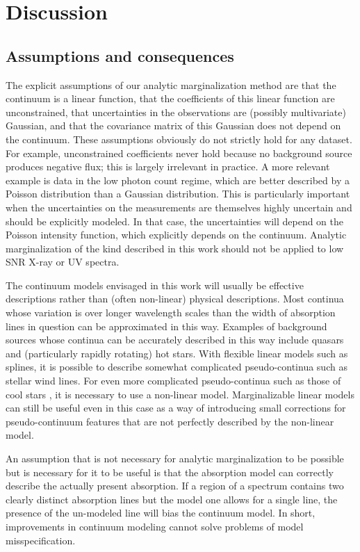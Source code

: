 \documentclass[manuscript]{aastex62}
\begin{document}
\section{Discussion}
\label{sec:discussion}
\subsection{Assumptions and consequences}
The explicit assumptions of our analytic marginalization method are that the continuum is a linear function, that the coefficients of this linear function are unconstrained, that uncertainties in the observations are (possibly multivariate) Gaussian, and that the covariance matrix of this Gaussian does not depend on the continuum.
These assumptions obviously do not strictly hold for any dataset.
For example, unconstrained coefficients never hold because no background source produces negative flux; this is largely irrelevant in practice.
A more relevant example is data in the low photon count regime, which are better described by a Poisson distribution than a Gaussian distribution.
This is particularly important when the uncertainties on the measurements are themselves highly uncertain and should be explicitly modeled.
In that case, the uncertainties will depend on the Poisson intensity function, which explicitly depends on the continuum.
Analytic marginalization of the kind described in this work should not be applied to low SNR X-ray or UV spectra.

The continuum models envisaged in this work will usually be effective descriptions rather than (often non-linear) physical descriptions.
Most continua whose variation is over longer wavelength scales than the width of absorption lines in question can be approximated in this way.
Examples of background sources whose continua can be accurately described in this way include quasars and (particularly rapidly rotating) hot stars.
With flexible linear models such as splines, it is possible to describe somewhat complicated pseudo-continua such as stellar wind lines.
For even more complicated pseudo-continua such as those of cool stars \citep[e.g.]{Zasowski:2015hi}, it is necessary to use a non-linear model.
Marginalizable linear models can still be useful even in this case as a way of introducing small corrections for pseudo-continuum features that are not perfectly described by the non-linear model.

An assumption that is not necessary for analytic marginalization to be possible but is necessary for it to be useful is that the absorption model can correctly describe the actually present absorption.
If a region of a spectrum contains two clearly distinct absorption lines but the model one allows for a single line, the presence of the un-modeled line will bias the continuum model.
In short, improvements in continuum modeling cannot solve problems of model misspecification.
\end{document}
